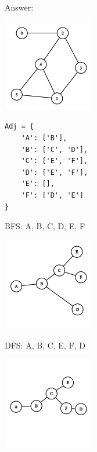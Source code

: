 \documentclass[12pt,twoside]{article}
\begin{document}


\begin{problems}

\problem  %

\begin{problemparts}
\problempart %
Answer:

\includegraphics[width=0.3\textwidth]{tex/ps5/1a.png}

\problempart %
\begin{verbatim}
Adj = {
    'A': ['B'],
    'B': ['C', 'D'],
    'C': ['E', 'F'],
    'D': ['E', 'F'],
    'E': [],
    'F': ['D', 'E']
}
\end{verbatim}

\problempart %
BFS: A, B, C, D, E, F

\includegraphics[width=0.3\textwidth]{tex/ps5/1c1.png}

DFS: A, B, C, E, F, D

\includegraphics[width=0.3\textwidth]{tex/ps5/1c2.png}


\end{problemparts}
\end{problems}
\end{document}
